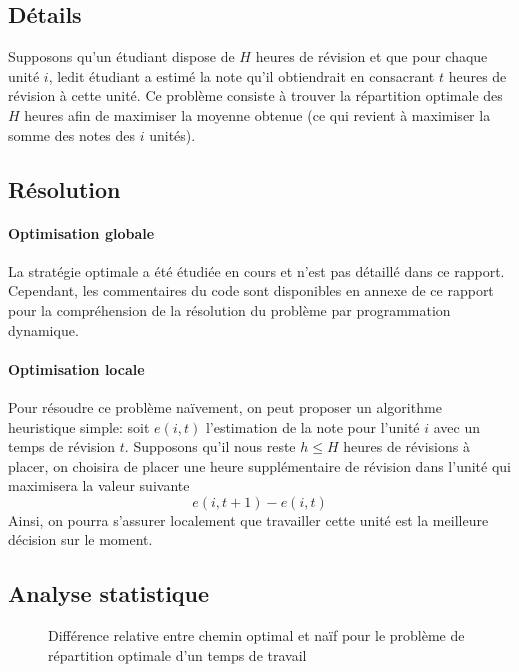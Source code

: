 \documentclass[a4paper,english,french]{article}
\begin{document}
\subsection*{Détails}

Supposons qu'un étudiant dispose de $H$ heures de révision et que pour chaque unité $i$, ledit étudiant a estimé la note qu'il obtiendrait en consacrant $t$ heures de révision à cette unité. Ce problème consiste à trouver la répartition optimale des $H$ heures afin de maximiser la moyenne obtenue (ce qui revient à maximiser la somme des notes des $i$ unités).

\subsection*{Résolution}

\paragraph*{Optimisation globale} La stratégie optimale a été étudiée en cours et n'est pas détaillé dans ce rapport. Cependant, les commentaires du code sont disponibles en annexe de ce rapport pour la compréhension de la résolution du problème par programmation dynamique.

\paragraph*{Optimisation locale} Pour résoudre ce problème naïvement, on peut proposer un algorithme heuristique simple: soit $e(i, t)$ l'estimation de la note pour l'unité $i$ avec un temps de révision $t$. Supposons qu'il nous reste $h \leq H$ heures de révisions à placer, on choisira de placer une heure supplémentaire de révision dans l'unité qui maximisera la valeur suivante \[ e(i, t + 1) - e(i, t) \] Ainsi, on pourra s'assurer localement que travailler cette unité est la meilleure décision sur le moment.

\subsection*{Analyse statistique}

\begin{figure}
\centering
{}
\caption{Différence relative entre chemin optimal et naïf pour le problème de répartition optimale d'un temps de travail}
\end{figure}
\end{document}
